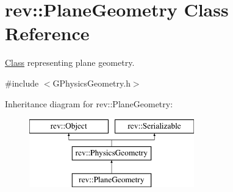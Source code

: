 \hypertarget{classrev_1_1_plane_geometry}{}\section{rev\+::Plane\+Geometry Class Reference}
\label{classrev_1_1_plane_geometry}


\mbox{\hyperlink{struct_class}{Class}} representing plane geometry.  




{\ttfamily \#include $<$G\+Physics\+Geometry.\+h$>$}

Inheritance diagram for rev\+::Plane\+Geometry\+:\begin{figure}[H]
\begin{center}
\leavevmode
\includegraphics[height=3.000000cm]{classrev_1_1_plane_geometry}
\end{center}
\end{figure}

